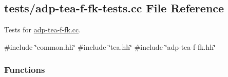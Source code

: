 \hypertarget{adp-tea-f-fk-tests_8cc}{\subsection{tests/adp-\/tea-\/f-\/fk-\/tests.cc \-File \-Reference}
\label{adp-tea-f-fk-tests_8cc}
}


\-Tests for \hyperlink{adp-tea-f-fk_8cc}{adp-\/tea-\/f-\/fk.\-cc}.  


{\ttfamily \#include \char`\"{}common.\-hh\char`\"{}}\*
{\ttfamily \#include \char`\"{}tea.\-hh\char`\"{}}\*
{\ttfamily \#include \char`\"{}adp-\/tea-\/f-\/fk.\-hh\char`\"{}}\*
\subsubsection*{\-Functions}
